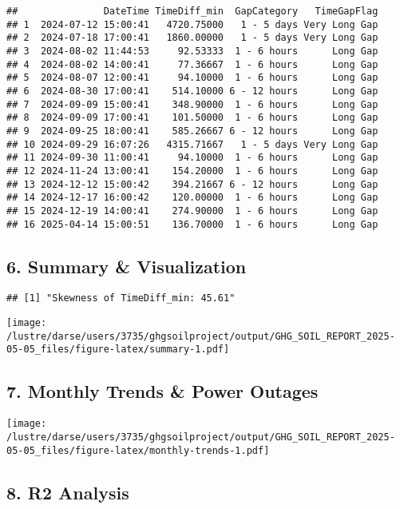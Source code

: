 \documentclass[
]{article}
\begin{document}
\begin{verbatim}
##               DateTime TimeDiff_min  GapCategory   TimeGapFlag
## 1  2024-07-12 15:00:41   4720.75000   1 - 5 days Very Long Gap
## 2  2024-07-18 17:00:41   1860.00000   1 - 5 days Very Long Gap
## 3  2024-08-02 11:44:53     92.53333  1 - 6 hours      Long Gap
## 4  2024-08-02 14:00:41     77.36667  1 - 6 hours      Long Gap
## 5  2024-08-07 12:00:41     94.10000  1 - 6 hours      Long Gap
## 6  2024-08-30 17:00:41    514.10000 6 - 12 hours      Long Gap
## 7  2024-09-09 15:00:41    348.90000  1 - 6 hours      Long Gap
## 8  2024-09-09 17:00:41    101.50000  1 - 6 hours      Long Gap
## 9  2024-09-25 18:00:41    585.26667 6 - 12 hours      Long Gap
## 10 2024-09-29 16:07:26   4315.71667   1 - 5 days Very Long Gap
## 11 2024-09-30 11:00:41     94.10000  1 - 6 hours      Long Gap
## 12 2024-11-24 13:00:41    154.20000  1 - 6 hours      Long Gap
## 13 2024-12-12 15:00:42    394.21667 6 - 12 hours      Long Gap
## 14 2024-12-17 16:00:42    120.00000  1 - 6 hours      Long Gap
## 15 2024-12-19 14:00:41    274.90000  1 - 6 hours      Long Gap
## 16 2025-04-14 15:00:51    136.70000  1 - 6 hours      Long Gap
\end{verbatim}

\hypertarget{summary-visualization}{%
\subsection{6. Summary \& Visualization}\label{summary-visualization}}

\begin{verbatim}
## [1] "Skewness of TimeDiff_min: 45.61"
\end{verbatim}

\texttt{[image: /lustre/darse/users/3735/ghgsoilproject/output/GHG\_SOIL\_REPORT\_2025-05-05\_files/figure-latex/summary-1.pdf]}

\hypertarget{monthly-trends-power-outages}{%
\subsection{7. Monthly Trends \& Power
Outages}\label{monthly-trends-power-outages}}

\texttt{[image: /lustre/darse/users/3735/ghgsoilproject/output/GHG\_SOIL\_REPORT\_2025-05-05\_files/figure-latex/monthly-trends-1.pdf]}

\hypertarget{r2-analysis}{%
\subsection{8. R2 Analysis}\label{r2-analysis}}
\end{document}
